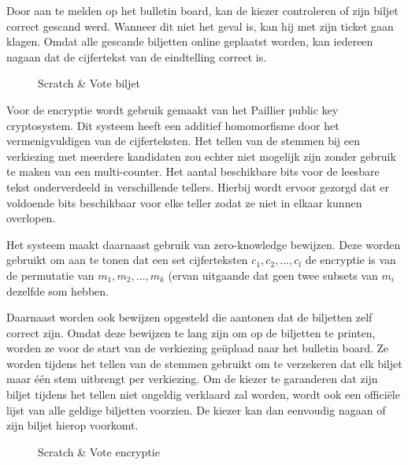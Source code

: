 \npar Door aan te melden op het bulletin board, kan de kiezer controleren of zijn biljet correct gescand werd. Wanneer dit niet het geval is, kan hij met zijn ticket gaan klagen. Omdat alle gescande biljetten online geplaatst worden, kan iedereen nagaan dat de cijfertekst van de eindtelling correct is.

\begin{figure}[H]
	\caption{Scratch \& Vote biljet\cite{adida_rivest_scratch_and_vote}}
	\label{fig:ls:scratch_and_vote_ballot}
\end{figure}

\npar Voor de encryptie wordt gebruik gemaakt van het Paillier public key cryptosystem. Dit systeem heeft een additief homomorfisme door het vermenigvuldigen van de cijferteksten. Het tellen van de stemmen bij een verkiezing met meerdere kandidaten zou echter niet mogelijk zijn zonder gebruik te maken van een multi-counter. Het aantal beschikbare bits voor de leesbare tekst onderverdeeld in verschillende tellers. Hierbij wordt ervoor gezorgd dat er voldoende bits beschikbaar voor elke teller zodat ze niet in elkaar kunnen overlopen.

\npar Het systeem maakt daarnaast gebruik van zero-knowledge bewijzen. Deze worden gebruikt om aan te tonen dat een set cijferteksten $c_1, c_2, \ldots, c_l$ de encryptie is van de permutatie van $m_1, m_2, \ldots, m_k$ (ervan uitgaande dat geen twee subsets van ${m_i}$ dezelfde som hebben.\cite{adida_rivest_scratch_and_vote}

\npar Daarnaast worden ook bewijzen opgesteld die aantonen dat de biljetten zelf correct zijn. Omdat deze bewijzen te lang zijn om op de biljetten te printen, worden ze voor de start van de verkiezing ge\"upload naar het bulletin board. Ze worden tijdens het tellen van de stemmen gebruikt om te verzekeren dat elk biljet maar \'e\'en stem uitbrengt per verkiezing. Om de kiezer te garanderen dat zijn biljet tijdens het tellen niet ongeldig verklaard zal worden, wordt ook een offici\"ele lijst van alle geldige biljetten voorzien. De kiezer kan dan eenvoudig nagaan of zijn biljet hierop voorkomt.

\begin{figure}[H]
	\caption{Scratch \& Vote encryptie\cite{adida_rivest_scratch_and_vote}}
	\label{fig:ls:scratch_and_vote_encryption}
\end{figure}

